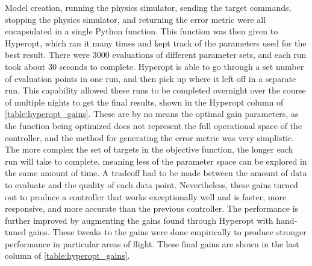 \documentclass[letterpaper,12pt,titlepage,oneside,final]{book}
\begin{document}
Model creation, running the physics simulator, sending the target commands, stopping the physics simulator, and returning the error metric were all encapsulated in a single Python function. 
This function was then given to Hyperopt, which ran it many times and kept track of the parameters used for the best result. 
There were 3000 evaluations of different parameter sets, and each run took about 30 seconds to complete. 
Hyperopt is able to go through a set number of evaluation points in one run, and then pick up where it left off in a separate run.
This capability allowed these runs to be completed overnight over the course of multiple nights to get the final results, shown in the Hyperopt column of \autoref{table:hyperopt_gains}. 
These are by no means the optimal gain parameters, as the function being optimized does not represent the full operational space of the controller, and the method for generating the error metric was very simplistic. 
The more complex the set of targets in the objective function, the longer each run will take to complete, meaning less of the parameter space can be explored in the same amount of time. 
A tradeoff had to be made between the amount of data to evaluate and the quality of each data point. 
Nevertheless, these gains turned out to produce a controller that works exceptionally well and is faster, more responsive, and more accurate than the previous controller.
The performance is further improved by augmenting the gains found through Hyperopt with hand-tuned gains.
These tweaks to the gains were done empirically to produce stronger performance in particular areas of flight. %
These final gains are shown in the last column of \autoref{table:hyperopt_gains}.

\end{document}
